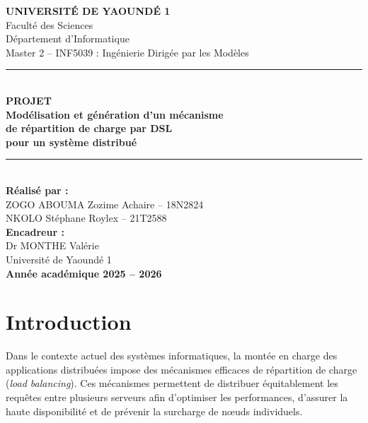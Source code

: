 \documentclass[12pt,a4paper]{report}
\begin{document}
\begin{titlepage}
\centering
\vspace*{1cm}

{\Large\bfseries UNIVERSITÉ DE YAOUNDÉ 1}\\[0.3cm]
{\large Faculté des Sciences}\\[0.2cm]
{\large Département d'Informatique}\\[0.2cm]
{\large Master 2 -- INF5039 : Ingénierie Dirigée par les Modèles}\\[2cm]

\rule{\textwidth}{1pt}\\[0.5cm]
{\LARGE\bfseries PROJET}\\[0.5cm]
{\Large\bfseries Modélisation et génération d'un mécanisme\\de répartition de charge par DSL\\pour un système distribué}\\[0.5cm]
\rule{\textwidth}{1pt}\\[2.5cm]

{\large\bfseries Réalisé par :}\\[0.3cm]
{\large ZOGO ABOUMA Zozime Achaire -- 18N2824}\\[0.2cm]
{\large NKOLO Stéphane Roylex -- 21T2588}\\[2cm]

{\large\bfseries Encadreur :}\\[0.3cm]
{\large Dr MONTHE Valérie}\\[0.2cm]
{\large Université de Yaoundé 1}\\[2.5cm]

{\large\bfseries Année académique 2025 -- 2026}

\end{titlepage}

\tableofcontents
\newpage

\chapter{Introduction}

Dans le contexte actuel des systèmes informatiques, la montée en charge des applications distribuées impose des mécanismes efficaces de répartition de charge (\textit{load balancing}). Ces mécanismes permettent de distribuer équitablement les requêtes entre plusieurs serveurs afin d'optimiser les performances, d'assurer la haute disponibilité et de prévenir la surcharge de nœuds individuels.
\end{document}
